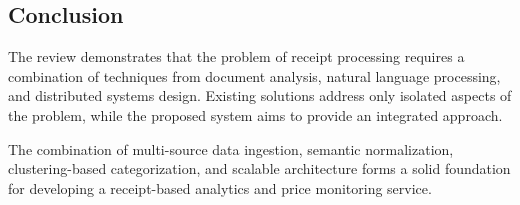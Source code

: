 \subsection{Conclusion}

The review demonstrates that the problem of receipt processing requires a combination of techniques from document analysis, natural language processing, and distributed systems design. Existing solutions address only isolated aspects of the problem, while the proposed system aims to provide an integrated approach.

The combination of multi-source data ingestion, semantic normalization, clustering-based categorization, and scalable architecture forms a solid foundation for developing a receipt-based analytics and price monitoring service.



